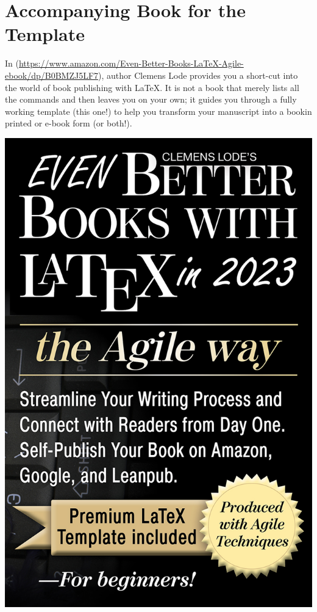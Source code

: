 

\chapter{Accompanying Book for the Template}
\label{additional-titles:sec}


In \ifxetex\else{} \citep{eBBWLtAW}\fi (\url{https://www.amazon.com/Even-Better-Books-LaTeX-Agile-ebook/dp/B0BMZJ5LF7}), author Clemens Lode provides you a short-cut into the world of book publishing with LaTeX. It is not a book that merely lists all the commands and then leaves you on your own; it guides you through a fully working template (this one!) to help you transform your manuscript into a book\emph{}in printed or e-book form (or both!).

\begin{center}
\includegraphics[width=.45\textwidth]{images/cover.jpg}
\end{center}

